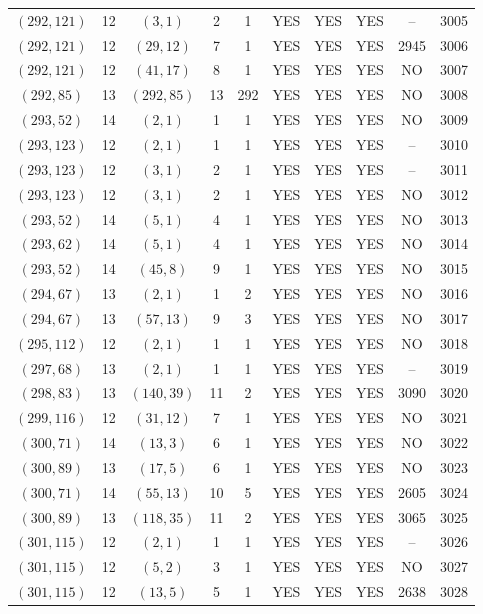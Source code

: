 \begin{longtable}{|c|c|c|c|c|c|c|c|c|c|}
$(292, 121)$ & 12 & $(3, 1)$ & 2 & 1 & YES & YES & YES & -- & 3005\\
$(292, 121)$ & 12 & $(29, 12)$ & 7 & 1 & YES & YES & YES & 2945 & 3006\\
$(292, 121)$ & 12 & $(41, 17)$ & 8 & 1 & YES & YES & YES & NO & 3007\\
$(292, 85)$ & 13 & $(292, 85)$ & 13 & 292 & YES & YES & YES & NO & 3008\\
$(293, 52)$ & 14 & $(2, 1)$ & 1 & 1 & YES & YES & YES & NO & 3009\\
$(293, 123)$ & 12 & $(2, 1)$ & 1 & 1 & YES & YES & YES & -- & 3010\\
$(293, 123)$ & 12 & $(3, 1)$ & 2 & 1 & YES & YES & YES & -- & 3011\\
$(293, 123)$ & 12 & $(3, 1)$ & 2 & 1 & YES & YES & YES & NO & 3012\\
$(293, 52)$ & 14 & $(5, 1)$ & 4 & 1 & YES & YES & YES & NO & 3013\\
$(293, 62)$ & 14 & $(5, 1)$ & 4 & 1 & YES & YES & YES & NO & 3014\\
$(293, 52)$ & 14 & $(45, 8)$ & 9 & 1 & YES & YES & YES & NO & 3015\\
$(294, 67)$ & 13 & $(2, 1)$ & 1 & 2 & YES & YES & YES & NO & 3016\\
$(294, 67)$ & 13 & $(57, 13)$ & 9 & 3 & YES & YES & YES & NO & 3017\\
$(295, 112)$ & 12 & $(2, 1)$ & 1 & 1 & YES & YES & YES & NO & 3018\\
$(297, 68)$ & 13 & $(2, 1)$ & 1 & 1 & YES & YES & YES & -- & 3019\\
$(298, 83)$ & 13 & $(140, 39)$ & 11 & 2 & YES & YES & YES & 3090 & 3020\\
$(299, 116)$ & 12 & $(31, 12)$ & 7 & 1 & YES & YES & YES & NO & 3021\\
$(300, 71)$ & 14 & $(13, 3)$ & 6 & 1 & YES & YES & YES & NO & 3022\\
$(300, 89)$ & 13 & $(17, 5)$ & 6 & 1 & YES & YES & YES & NO & 3023\\
$(300, 71)$ & 14 & $(55, 13)$ & 10 & 5 & YES & YES & YES & 2605 & 3024\\
$(300, 89)$ & 13 & $(118, 35)$ & 11 & 2 & YES & YES & YES & 3065 & 3025\\
$(301, 115)$ & 12 & $(2, 1)$ & 1 & 1 & YES & YES & YES & -- & 3026\\
$(301, 115)$ & 12 & $(5, 2)$ & 3 & 1 & YES & YES & YES & NO & 3027\\
$(301, 115)$ & 12 & $(13, 5)$ & 5 & 1 & YES & YES & YES & 2638 & 3028\\

\end{longtable}
